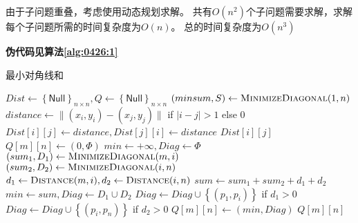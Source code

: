 \documentclass[answers]{exam}
\begin{document}
\begin{questions}
\begin{parts}
\begin{solution}
            由于子问题重叠，考虑使用动态规划求解。
            共有$O(n^2)$个子问题需要求解，求解每个子问题所需的时间复杂度为$O(n)$。
            总的时间复杂度为$O(n^3)$

            \textbf{伪代码见算法\ref{alg:0426:1}}
        \end{solution}

        \begin{algorithm}[!ht]
            \caption{最小对角线和}\label{alg:0426:1}
            \begin{algorithmic}[1]
                \State $Dist \gets \left\{ \mathsf{Null} \right\}_{n \times n}, Q \gets \left\{ \mathsf{Null} \right\}_{n \times n}$
                \State $(minsum, S) \gets \Call{MinimizeDiagonal}{1,n}$
                \Statex
                \State $distance \gets \| (x_i,y_i) - (x_j,y_j) \|$ if $|i-j| > 1$ else $0$
                \State $Dist[i][j] \gets distance, Dist[j][i] \gets distance$
                \EndIf
                \State \Return $Dist[i][j]$
                \EndProcedure
                \Statex
                \Statex {}
                \State $Q[m][n] \gets (0, \Phi)$
                \Else
                \State $min \gets +\infty, Diag \gets \Phi$
                \State $(sum_1, D_1) \gets \Call{MinimizeDiagonal}{m,i}$
                \State $(sum_2, D_2) \gets \Call{MinimizeDiagonal}{i,n}$
                \State $d_1 \gets \Call{Distance}{m,i}, d_2 \gets \Call{Distance}{i,n}$
                \State $sum \gets sum_1 + sum_2 + d_1 + d_2$
                \State $min \gets sum , Diag \gets D_1 \cup D_2$
                \State $Diag \gets Diag \cup \left\{(p_1, p_i) \right\}$ if $d_1 > 0$
                \State $Diag \gets Diag \cup \left\{(p_i, p_n) \right\}$ if $d_2 > 0$
                \EndIf
                \EndFor
                \State $Q[m][n] \gets (min, Diag)$
                \EndIf
                \EndIf
                \State \Return $Q[m][n]$
                \EndProcedure
            \end{algorithmic}
        \end{algorithm}
    \end{parts}


\end{questions}
\end{document}
